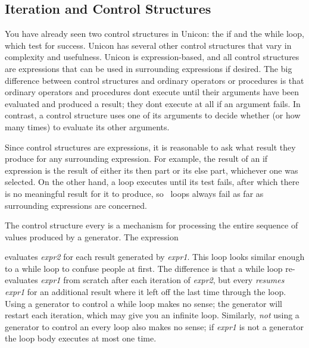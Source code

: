 \subsection{Iteration and Control Structures}
You have already seen two control structures in Unicon: the \textsf{if}
and the \textsf{while} loop, which test for success.
Unicon has several other control structures that vary in complexity and
usefulness. Unicon is expression-based, and all control structures are
expressions that can be used in surrounding expressions if desired. The
big difference between control structures and ordinary operators or
procedures is that ordinary operators and procedures
don{\textquotesingle}t execute until their arguments have been
evaluated and produced a result; they don{\textquotesingle}t execute at
all if an argument fails. In contrast, a control structure uses one of
its arguments to decide whether (or how many times) to evaluate its
other arguments.

Since control structures are expressions, it is reasonable to ask what
result they produce for any surrounding expression. For example, the
result of an \textsf{if} expression is the result of either its
\textsf{then} part or its \textsf{else} part, whichever one was
selected. On the other hand, a loop executes until its test fails,
after which there is no meaningful result for it to produce, so \ loops
always fail as far as surrounding expressions are concerned.

The control structure
\textsf{every} is a mechanism for processing the entire
sequence of values produced by a generator. The expression 


\noindent
evaluates \textsf{\textit{expr2}} for each result generated by
\textsf{\textit{expr1}}. This loop looks similar enough to a
\textsf{while} loop to confuse people at first. The difference is that
a \textsf{while} loop re-evaluates \textsf{\textit{expr1}} from scratch
after each iteration of \textsf{\textit{expr2}}, but \textsf{every}
\textit{resumes} \textsf{\textit{expr1}} for an additional result where
it left off the last time through the loop. Using a generator to
control a \textsf{while} loop makes no sense; the generator will
restart each iteration, which may give you an infinite loop. Similarly,
\textit{not} using a generator to control an \textsf{every} loop also
makes no sense; if \textsf{\textit{expr1}} is not a generator the loop
body executes at most one time.


